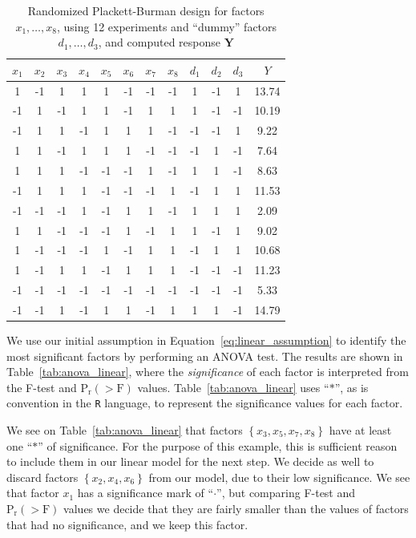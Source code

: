 \documentclass[conference]{IEEEtran}
\begin{document}
\begin{table}[b]
\centering
\caption{Randomized Plackett-Burman design for factors $x_1, \dots, x_8$, using 12 experiments and ``dummy'' factors $d_1, \dots, d_3$, and computed response $\mathbf{Y}$}
\label{tab:plackett}
\begingroup\scriptsize
\begin{tabular}{cccccccccccc}
  \toprule
$x_1$ & $x_2$ & $x_3$ & $x_4$ & $x_5$ & $x_6$ & $x_7$ & $x_8$ & $d_1$ & $d_2$ & $d_3$ & $Y$ \\
  \midrule
1 & -1 & 1 & 1 & 1 & -1 & -1 & -1 & 1 & -1 & 1 & 13.74 \\
  -1 & 1 & -1 & 1 & 1 & -1 & 1 & 1 & 1 & -1 & -1 & 10.19 \\
  -1 & 1 & 1 & -1 & 1 & 1 & 1 & -1 & -1 & -1 & 1 & 9.22 \\
  1 & 1 & -1 & 1 & 1 & 1 & -1 & -1 & -1 & 1 & -1 & 7.64 \\
  1 & 1 & 1 & -1 & -1 & -1 & 1 & -1 & 1 & 1 & -1 & 8.63 \\
  -1 & 1 & 1 & 1 & -1 & -1 & -1 & 1 & -1 & 1 & 1 & 11.53 \\
  -1 & -1 & -1 & 1 & -1 & 1 & 1 & -1 & 1 & 1 & 1 & 2.09 \\
  1 & 1 & -1 & -1 & -1 & 1 & -1 & 1 & 1 & -1 & 1 & 9.02 \\
  1 & -1 & -1 & -1 & 1 & -1 & 1 & 1 & -1 & 1 & 1 & 10.68 \\
  1 & -1 & 1 & 1 & -1 & 1 & 1 & 1 & -1 & -1 & -1 & 11.23 \\
  -1 & -1 & -1 & -1 & -1 & -1 & -1 & -1 & -1 & -1 & -1 & 5.33 \\
  -1 & -1 & 1 & -1 & 1 & 1 & -1 & 1 & 1 & 1 & -1 & 14.79 \\
   \bottomrule
\end{tabular}
\endgroup
\end{table}

We use our initial assumption in Equation~\eqref{eq:linear_assumption} to
identify the most significant factors by performing an ANOVA test. The results
are shown in Table~\ref{tab:anova_linear}, where the \emph{significance} of
each factor is interpreted from the F-test and \(\text{P}_{\text{r}}(>\text{F})\)
values. Table~\ref{tab:anova_linear} uses ``\(*\)'', as is convention in the
\texttt{R} language, to represent the significance values for each factor.

We see on Table~\ref{tab:anova_linear} that factors
\(\left\{x_3,x_5,x_7,x_8\right\}\) have at least one ``\(*\)'' of significance. For
the purpose of this example, this is sufficient reason to include them in our
linear model for the next step. We decide as well to discard factors
\(\left\{x_2,x_4,x_6\right\}\) from our model, due to their low significance. We
see that factor \(x_1\) has a significance mark of ``\(\cdot\)'', but comparing F-test
and \(\text{P}_{\text{r}}(>\text{F})\) values we decide that they are fairly
smaller than the values of factors that had no significance, and we keep this
factor.
\end{document}
